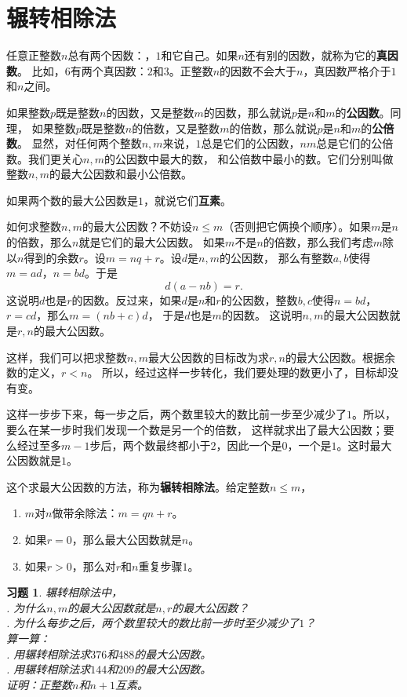 \documentclass[12pt,UTF8]{ctexbook}
\newtheorem{xt}{习题}[section]
\begin{document}
\section{辗转相除法}
任意正整数$n$总有两个因数：，$1$和它自己。如果$n$还有别的因数，就称为它的\textbf{真因数}。
比如，$6$有两个真因数：$2$和$3$。正整数$n$的因数不会大于$n$，真因数严格介于$1$和$n$之间。

如果整数$p$既是整数$n$的因数，又是整数$m$的因数，那么就说$p$是$n$和$m$的\textbf{公因数}。同理，
如果整数$p$既是整数$n$的倍数，又是整数$m$的倍数，那么就说$p$是$n$和$m$的\textbf{公倍数}。
显然，对任何两个整数$n,m$来说，$1$总是它们的公因数，$nm$总是它们的公倍数。我们更关心$n,m$的公因数中最大的数，
和公倍数中最小的数。它们分别叫做整数$n,m$的最大公因数和最小公倍数。

如果两个数的最大公因数是$1$，就说它们\textbf{互素}。

如何求整数$n,m$的最大公因数？不妨设$n\leqslant m$（否则把它俩换个顺序）。如果$m$是$n$的倍数，那么$n$就是它们的最大公因数。
如果$m$不是$n$的倍数，那么我们考虑$m$除以$n$得到的余数$r$。设$m = nq + r$。设$d$是$n,m$的公因数，
那么有整数$a,b$使得$m = ad$，$n = bd$。于是
$$ d(a - nb) = r.$$
这说明$d$也是$r$的因数。反过来，如果$d$是$n$和$r$的公因数，整数$b, c$使得$n = bd$，$r = cd$，那么$m = (nb + c)d$，
于是$d$也是$m$的因数。
这说明$n,m$的最大公因数就是$r,n$的最大公因数。

这样，我们可以把求整数$n,m$最大公因数的目标改为求$r,n$的最大公因数。根据余数的定义，$r < n$。
所以，经过这样一步转化，我们要处理的数更小了，目标却没有变。

这样一步步下来，每一步之后，两个数里较大的数比前一步至少减少了$1$。所以，要么在某一步时我们发现一个数是另一个的倍数，
这样就求出了最大公因数；要么经过至多$m-1$步后，两个数最终都小于$2$，因此一个是$0$，一个是$1$。这时最大公因数就是$1$。

这个求最大公因数的方法，称为\textbf{辗转相除法}。给定整数$n\leqslant m$，
\begin{enumerate}
    \item $m$对$n$做带余除法：$m = q n + r$。
    \item 如果$r = 0$，那么最大公因数就是$n$。
    \item 如果$r > 0$，那么对$r$和$n$重复步骤$1$。
\end{enumerate}

\begin{xt}\label{xt:5-1-0}
    辗转相除法中，\\
    . 为什么$n,m$的最大公因数就是$n,r$的最大公因数？\\
    . 为什么每步之后，两个数里较大的数比前一步时至少减少了$1$？\\
    算一算：\\
    . 用辗转相除法求$376$和$488$的最大公因数。\\
    . 用辗转相除法求$144$和$209$的最大公因数。\\
    证明：正整数$n$和$n+1$互素。
\end{xt}
\end{document}
